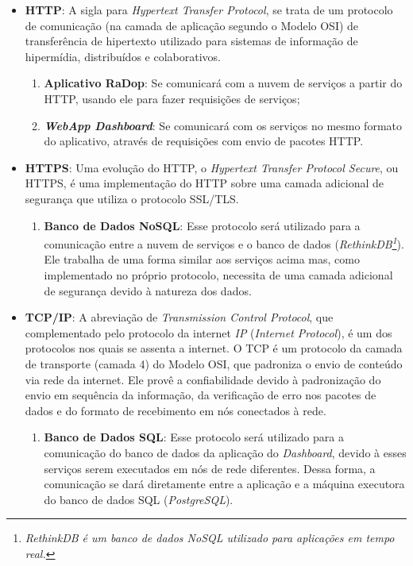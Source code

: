 \begin{itemize}
    \item \textbf{HTTP}:
    A sigla para \textit{Hypertext Transfer Protocol}, se trata de um protocolo de comunicação (na camada de aplicação segundo o Modelo OSI) de transferência de hipertexto utilizado para sistemas de informação de hipermídia, distribuídos e colaborativos.
    \begin{enumerate}
        \item \textbf{Aplicativo RaDop}: Se comunicará com a nuvem de serviços a partir do HTTP, usando ele para fazer requisições de serviços;
        \item \textbf{\textit{WebApp Dashboard}}: Se comunicará com os serviços no mesmo formato do aplicativo, através de requisições com envio de pacotes HTTP.
    \end{enumerate}

    \item \textbf{HTTPS}:
    Uma evolução do HTTP, o \textit{Hypertext Transfer Protocol Secure}, ou HTTPS, é uma implementação do HTTP sobre uma camada adicional de segurança que utiliza o protocolo SSL/TLS.
    \begin{enumerate}
        \item \textbf{Banco de Dados NoSQL}: Esse protocolo será utilizado para a comunicação entre a nuvem de serviços e o banco de dados (\textit{RethinkDB\footnote{\textit{RethinkDB é um banco de dados \textit{NoSQL} utilizado para aplicações em tempo real.}}}). Ele trabalha de uma forma similar aos serviços acima mas, como implementado no próprio protocolo, necessita de uma camada adicional de segurança devido à natureza dos dados.
    \end{enumerate}

    \item \textbf{TCP/IP}:
    A abreviação de \textit{Transmission Control Protocol}, que complementado pelo protocolo da internet \textit{IP} (\textit{Internet Protocol}), é um dos protocolos nos quais se assenta a internet. O TCP é um protocolo da camada de transporte (camada 4) do Modelo OSI, que padroniza o envio de conteúdo via rede da internet. Ele provê a confiabilidade devido à padronização do envio em sequência da informação, da verificação de erro nos pacotes de dados e do formato de recebimento em nós conectados à rede.
    \begin{enumerate}
        \item \textbf{Banco de Dados SQL}: Esse protocolo será utilizado para a comunicação do banco de dados da aplicação do \textit{Dashboard}, devido à esses serviços serem executados em nós de rede diferentes. Dessa forma, a comunicação se dará diretamente entre a aplicação e a máquina executora do banco de dados SQL (\textit{PostgreSQL}).
    \end{enumerate}
\end{itemize}

